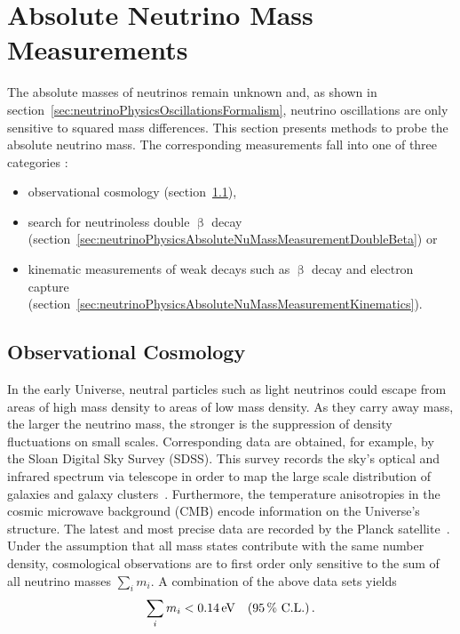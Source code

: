 \section{Absolute Neutrino Mass Measurements}
\label{sec:neutrinoPhysicsAbsoluteNuMassMeasurement}
The absolute masses of neutrinos remain unknown and, as shown in section~\ref{sec:neutrinoPhysicsOscillationsFormalism}, neutrino oscillations are only sensitive to squared mass differences. This section presents methods to probe the absolute neutrino mass. The corresponding measurements fall into one of three categories \cite{Otten:2008zz}:
\begin{itemize}
    \renewcommand{\labelitemi}{$\bullet$}
    \item observational cosmology (section~\ref{sec:neutrinoPhysicsAbsoluteNuMassMeasurementCosmo}),
    \item search for neutrinoless double $\upbeta$ decay (section~\ref{sec:neutrinoPhysicsAbsoluteNuMassMeasurementDoubleBeta}) or
    \item kinematic measurements of weak decays such as $\upbeta$ decay and electron capture (section~\ref{sec:neutrinoPhysicsAbsoluteNuMassMeasurementKinematics}).
\end{itemize}

\subsection{Observational Cosmology}
\label{sec:neutrinoPhysicsAbsoluteNuMassMeasurementCosmo}
In the early Universe, neutral particles such as light neutrinos could escape from areas of high mass density to areas of low mass density. As they carry away mass, the larger the neutrino mass, the stronger is the suppression of density fluctuations on small scales. Corresponding data are obtained, for example, by the Sloan Digital Sky Survey (SDSS). This survey records the sky's optical and infrared spectrum via telescope in order to map the large scale distribution of galaxies and galaxy clusters~\cite{Doroshkevich2004}. Furthermore, the temperature anisotropies in the cosmic microwave background (CMB) encode information on the Universe's structure. The latest and most precise data are recorded by the Planck satellite~\cite{Aghanim:2018}. Under the assumption that all mass states contribute with the same number density, cosmological observations are to first order only sensitive to the sum of all neutrino masses $\sum_{i} m_i$. A combination of the above data sets yields \cite{Yeche:2017upn}
\begin{equation*}
    \sum_i m_i < \SI{0.14}{eV} \quad (\SI{95}{\percent} \text{ C.L.}) \text{\,.}
\end{equation*}
\FloatBarrier

